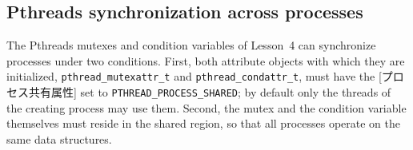 \documentclass[../main.tex]{subfiles}
\begin{document}
\subsection{Pthreads synchronization across processes}

\begin{sloppypar}
The Pthreads mutexes and condition variables of Lesson~4 can synchronize
processes under two conditions.  First, both attribute objects with which
they are initialized, \texttt{pthread\_\allowbreak mutexattr\_t} and
\texttt{pthread\_\allowbreak condattr\_t}, must have the [プロセス共有属性] set to \texttt{PTHREAD\_\allowbreak PROCESS\_\allowbreak SHARED}; by
default only the threads of the creating process may use them.  Second, the
mutex and the condition variable themselves must reside in the shared
region, so that all processes operate on the same data structures.
\end{sloppypar}
\end{document}
